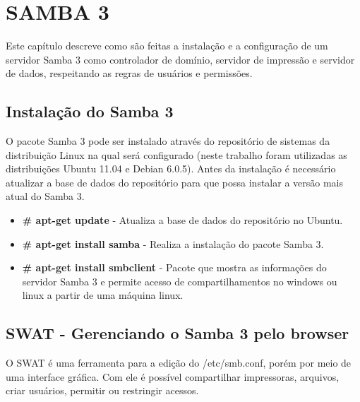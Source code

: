 \chapter{SAMBA 3}
Este capítulo descreve como são feitas a instalação e a configuração de um servidor Samba 3 como controlador de domínio, servidor de impressão e servidor de dados, respeitando as regras de usuários e permissões.

\section{Instalação do Samba 3}


O pacote Samba 3 pode ser instalado através do repositório de sistemas da distribuição Linux na qual será configurado (neste trabalho foram utilizadas as distribuições Ubuntu 11.04 e Debian 6.0.5). Antes da instalação é necessário atualizar a base de dados do repositório para que possa instalar a versão mais atual do Samba 3.
 
\begin{itemize}
    \item \textbf{\# apt-get update} - Atualiza a base de dados do repositório no Ubuntu.
    \item \textbf{\# apt-get install samba} - Realiza a instalação do pacote Samba 3.
    \item \textbf{\# apt-get install smbclient} - Pacote que mostra as informações do servidor Samba 3 e permite acesso de compartilhamentos no windows ou linux a partir de uma máquina linux.
\end{itemize}

\section{SWAT - Gerenciando o Samba 3 pelo browser}

O SWAT é uma ferramenta para a edição do /etc/smb.conf, porém por meio de uma interface gráfica. Com ele é possível compartilhar impressoras, arquivos, criar usuários, permitir ou restringir acessos.

